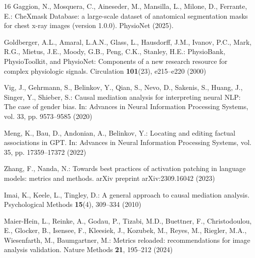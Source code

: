\documentclass[runningheads]{llncs}
\begin{document}
\begin{thebibliography}{16}
Gaggion, N., Mosquera, C., Aineseder, M., Mansilla, L., Milone, D., Ferrante, E.: CheXmask Database: a large-scale dataset of anatomical segmentation masks for chest x-ray images (version 1.0.0). PhysioNet (2025). 

Goldberger, A.L., Amaral, L.A.N., Glass, L., Hausdorff, J.M., Ivanov, P.C., Mark, R.G., Mietus, J.E., Moody, G.B., Peng, C.K., Stanley, H.E.: PhysioBank, PhysioToolkit, and PhysioNet: Components of a new research resource for complex physiologic signals. Circulation \textbf{101}(23), e215--e220 (2000)

Vig, J., Gehrmann, S., Belinkov, Y., Qian, S., Nevo, D., Sakenis, S., Huang, J., Singer, Y., Shieber, S.: Causal mediation analysis for interpreting neural NLP: The case of gender bias. In: Advances in Neural Information Processing Systems, vol. 33, pp. 9573--9585 (2020)

Meng, K., Bau, D., Andonian, A., Belinkov, Y.: Locating and editing factual associations in GPT. In: Advances in Neural Information Processing Systems, vol. 35, pp. 17359--17372 (2022)

Zhang, F., Nanda, N.: Towards best practices of activation patching in language models: metrics and methods. arXiv preprint arXiv:2309.16042 (2023)

Imai, K., Keele, L., Tingley, D.: A general approach to causal mediation analysis. Psychological Methods \textbf{15}(4), 309--334 (2010)

Maier-Hein, L., Reinke, A., Godau, P., Tizabi, M.D., Buettner, F., Christodoulou, E., Glocker, B., Isensee, F., Kleesiek, J., Kozubek, M., Reyes, M., Riegler, M.A., Wiesenfarth, M., Baumgartner, M.: Metrics reloaded: recommendations for image analysis validation. Nature Methods \textbf{21}, 195--212 (2024)

\end{thebibliography}
\end{document}
